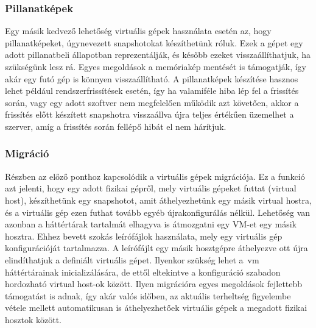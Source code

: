 \subsubsection{Pillanatképek}
Egy másik kedvező lehetőség virtuális gépek használata esetén az, hogy pillanatképeket, úgynevezett snapshotokat készíthetünk róluk. Ezek a gépet egy adott pillanatbeli állapotban reprezentálják, és később ezeket visszaállíthatjuk, ha szükségünk lesz rá. Egyes megoldások a memóriakép mentését is támogatják, így akár egy futó gép is könnyen visszaállítható. A pillanatképek készítése hasznos lehet például rendszerfrissítések esetén, így ha valamiféle hiba lép fel a frissítés során, vagy egy adott szoftver nem megfelelően működik azt követően, akkor a frissítés előtt készített snapshotra visszaállva újra teljes értékűen üzemelhet a szerver, amíg a frissítés során fellépő hibát el nem hárítjuk.

\subsubsection{Migráció}
Részben az előző ponthoz kapcsolódik a virtuális gépek migrációja. Ez a funkció azt jelenti, hogy egy adott fizikai gépről, mely virtuális gépeket futtat (virtual host), készíthetünk egy snapshotot, amit áthelyezhetünk egy másik virtual hostra, és a virtuális gép ezen futhat tovább egyéb újrakonfigurálás nélkül.
Lehetőség van azonban a háttértárak tartalmát elhagyva is átmozgatni egy VM-et egy másik hosztra. Ehhez bevett szokás leírófájlok használata, mely egy virtuális gép konfigurációját tartalmazza. A leírófájlt egy másik hosztgépre áthelyezve ott újra elindíthatjuk a definiált virtuális gépet. Ilyenkor szükség lehet a~\acrshort{vm} háttértárainak inicializálására, de ettől eltekintve a konfiguráció szabadon hordozható virtual host-ok között. Ilyen migrációra egyes megoldások fejlettebb támogatást is adnak, így akár valós időben, az aktuális terheltség figyelembe vétele mellett automatikusan is áthelyezhetőek virtuális gépek a megadott fizikai hosztok között.

